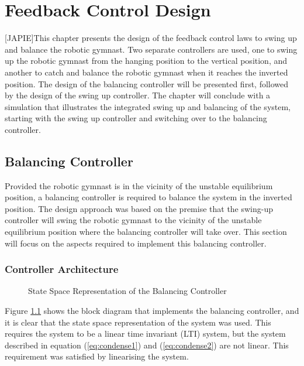 \chapter{Feedback Control Design}
\label{chp:controller}
[JAPIE]This chapter presents the design of the feedback control laws to swing up and balance the robotic gymnast. Two separate controllers are used, one to swing up the robotic gymnast from the hanging position to the vertical position, and another to catch and balance the robotic gymnast when it reaches the inverted position. The design of the balancing controller will be presented first, followed by the design of the swing up controller. The chapter will conclude with a simulation that illustrates the integrated swing up and balancing of the system, starting with the swing up controller and switching over to the balancing controller.

\section{Balancing Controller}

Provided the robotic gymnast is in the vicinity of the unstable equilibrium position, a balancing controller is required to balance the system in the inverted position. The design approach was based on the premise that the swing-up controller will swing the robotic gymnast to the vicinity of the unstable equilibrium position where the balancing controller will take over. This section will focus on the aspects required to implement this balancing controller.\\


\subsection{Controller Architecture}
\begin{figure}
	\centering
	
	\caption{State Space Representation of the Balancing Controller}
	\label{fig:linearSys2}
\end{figure}

Figure \ref{fig:linearSys2} shows the block diagram that implements the balancing controller, and it is clear that the state space representation of the system was used. This requires the system to be a linear time invariant (LTI) system, but the system described in equation (\ref{eq:condense1}) and (\ref{eq:condense2}) are not linear. This requirement was satisfied by linearising the system.\\


